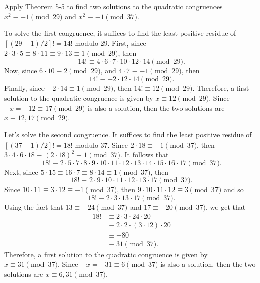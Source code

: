 \begin{exercise}
    Apply Theorem 5-5 to find two solutions to the quadratic congruences $x^2 \equiv -1 \pmod{29}$ and $x^2 \equiv - 1 \pmod{37}$. \\
\end{exercise}

\begin{solution}
    To solve the first congruence, it suffices to find the least positive residue of $[(29-1)/2]! = 14!$ modulo 29. First, since $2\cdot 3 \cdot 5 \equiv 8\cdot 11 \equiv 9\cdot 13 \equiv 1 \pmod{29}$, then
    $$14! \equiv 4\cdot 6 \cdot 7 \cdot 10 \cdot 12 \cdot 14\pmod{29}.$$
    Now, since $6\cdot 10 \equiv 2 \pmod{29}$, and $4\cdot 7 \equiv -1 \pmod{29}$, then
    $$14! \equiv -2\cdot 12 \cdot 14 \pmod{29}.$$
    Finally, since $-2 \cdot 14 \equiv 1 \pmod{29}$, then $14! \equiv 12 \pmod{29}$. Therefore, a first solution to the quadratic congruence is given by $x \equiv 12 \pmod{29}$. Since $-x = -12 \equiv 17 \pmod{29}$ is also a solution, then the two solutions are $x \equiv 12,17 \pmod{29}$.
    
    Let's solve the second congruence. It suffices to find the least positive residue of $[(37 - 1)/2]! = 18!$ modulo 37. Since $2\cdot 18 \equiv -1 \pmod{37}$, then $3\cdot 4 \cdot 6 \cdot 18 \equiv (2\cdot 18)^2 \equiv 1 \pmod{37}$. It follows that
    $$18! \equiv 2\cdot 5 \cdot 7 \cdot 8 \cdot 9 \cdot 10 \cdot 11 \cdot 12 \cdot 13 \cdot 14 \cdot 15 \cdot 16 \cdot 17 \pmod{37}.$$
    Next, since $5 \cdot 15 \equiv 16 \cdot 7 \equiv 8 \cdot 14 \equiv 1  \pmod{37}$, then 
    $$18! \equiv 2 \cdot 9 \cdot 10 \cdot 11 \cdot 12 \cdot 13 \cdot 17 \pmod{37}.$$
    Since $10\cdot 11 \equiv 3\cdot 12 \equiv-1 \pmod{37}$, then $9 \cdot 10 \cdot 11 \cdot 12 \equiv 3 \pmod{37}$ and so
    $$18! \equiv 2 \cdot 3 \cdot 13 \cdot 17 \pmod{37}.$$
    Using the fact that $13\equiv - 24 \pmod{37}$ and $17 \equiv - 20 \pmod{37}$, we get that
    \begin{align*}
        18! &\equiv 2 \cdot 3 \cdot 24 \cdot 20 \\
        &\equiv 2\cdot 2 \cdot (3 \cdot 12) \cdot 20 \\
        &\equiv - 80 \\
        &\equiv 31\pmod{37}.
    \end{align*}
    Therefore, a first solution to the quadratic congruence is given by $x \equiv 31 \pmod{37}$. Since $-x = -31 \equiv 6 \pmod{37}$ is also a solution, then the two solutions are $x \equiv 6,31 \pmod{37}$. \\
\end{solution}

